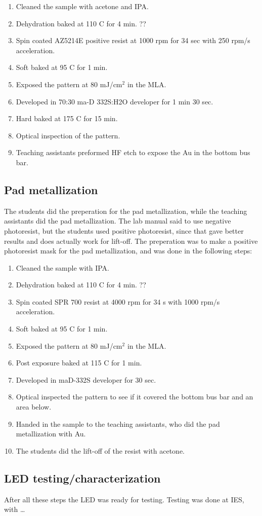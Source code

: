 \begin{enumerate}
    \item Cleaned the sample with acetone and IPA.
    \item Dehydration baked at 110 \textdegree C for 4 min. ??
    \item Spin coated AZ5214E positive resist at 1000 rpm for 34 sec with 250 rpm/s acceleration.
    \item Soft baked at 95 \textdegree C for 1 min.
    \item Exposed the pattern at 80 mJ/cm$^2$ in the MLA.
    \item Developed in 70:30 ma-D 332S:H2O developer for 1 min 30 sec.
    \item Hard baked at 175 \textdegree C for 15 min.
    \item Optical inspection of the pattern.
    \item Teaching assistants preformed HF etch to expose the Au in the bottom bus bar.
\end{enumerate}



\subsection{Pad metallization}
\label{methods:pad_metallization}

The students did the preperation for the pad metallization, while the teaching assistants did the pad metallization.
The lab manual said to use negative photoresist, but the students used positive photoresist, since that gave better results and does actually work for lift-off. %
The preperation was to make a positive photoresist mask for the pad metallization, and was done in the following steps:
\begin{enumerate}
    \item Cleaned the sample with IPA.
    \item Dehydration baked at 110 \textdegree C for 4 min. ??
    \item Spin coated SPR 700 resist at 4000 rpm for 34 s with 1000 rpm/s acceleration.
    \item Soft baked at 95 \textdegree C for 1 min.
    \item Exposed the pattern at 80 mJ/cm$^2$ in the MLA.
    \item Post exposure baked at 115 \textdegree C for 1 min.
    \item Developed in maD-332S developer for 30 sec.
    \item Optical inspected the pattern to see if it covered the bottom bus bar and an area below.
    \item Handed in the sample to the teaching assistants, who did the pad metallization with Au.
    \item The students did the lift-off of the resist with acetone.
\end{enumerate}


\subsection{LED testing/characterization}
\label{methods:LED_testing}
After all these steps the LED was ready for testing.
Testing was done at IES, with \dots

